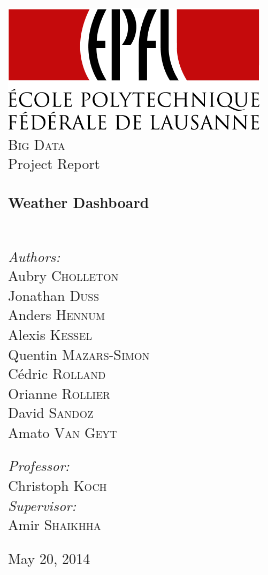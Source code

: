 \begin{titlepage}

\begin{center}


\includegraphics[width=0.50\textwidth]{./figures/logo}\\[3 cm]

\textsc{\large Big Data}\\[1.5cm]

{\Large Project Report}\\[0.5cm]


\HRule \\[0.4cm]
{ \huge \bfseries Weather Dashboard}\\[0.2cm]

\HRule \\[1.5cm]

\begin{minipage}{0.5\textwidth}
\begin{flushleft} \large
\emph{Authors:}\\
Aubry \textsc{Cholleton}\\
Jonathan \textsc{Duss}\\
Anders \textsc{Hennum}\\
Alexis \textsc{Kessel}\\
Quentin \textsc{Mazars-Simon}\\
Cédric \textsc{Rolland}\\
Orianne \textsc{Rollier}\\
David \textsc{Sandoz}\\
Amato \textsc{Van Geyt}
\end{flushleft}
\end{minipage}
\begin{minipage}{0.4\textwidth}
\begin{flushright} \large
\emph{Professor:} \\
Christoph \textsc{Koch} \\
\emph{Supervisor:} \\
Amir \textsc{Shaikhha} \\
\end{flushright}
\end{minipage}

\vfill

{\large May 20, 2014}

\end{center}

\end{titlepage} 
